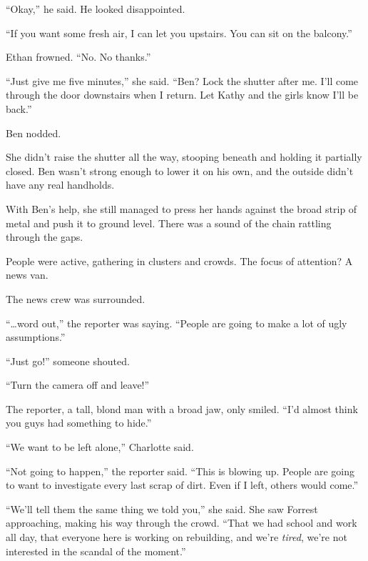 ``Okay,'' he said.  He looked disappointed.



``If you want some fresh air, I can let you upstairs.  You can sit on the balcony.''



Ethan frowned.  ``No.  No thanks.''



``Just give me five minutes,'' she said.  ``Ben?  Lock the shutter after me.  I'll come through the door downstairs when I return.  Let Kathy and the girls know I'll be back.''



Ben nodded.



She didn't raise the shutter all the way, stooping beneath and holding it partially closed.  Ben wasn't strong enough to lower it on his own, and the outside didn't have any real handholds.



With Ben's help, she still managed to press her hands against the broad strip of metal and push it to ground level.  There was a sound of the chain rattling through the gaps.



People were active, gathering in clusters and crowds.  The focus of attention?  A news van.



The news crew was surrounded.



``\ldots{}word out,'' the reporter was saying.  ``People are going to make a lot of ugly assumptions.''



``Just go!'' someone shouted.



``Turn the camera off and leave!''



The reporter, a tall, blond man with a broad jaw, only smiled.  ``I'd almost think you guys had something to hide.''



``We want to be left alone,'' Charlotte said.



``Not going to happen,'' the reporter said.  ``This is blowing up.  People are going to want to investigate every last scrap of dirt.  Even if I left, others would come.''



``We'll tell them the same thing we told you,'' she said.  She saw Forrest approaching, making his way through the crowd.  ``That we had school and work all day, that everyone here is working on rebuilding, and we're \emph{tired}, we're not interested in the scandal of the moment.''




